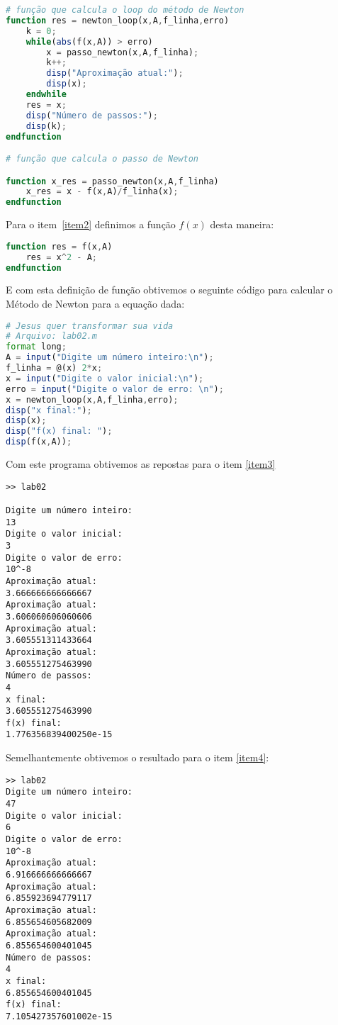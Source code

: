 \documentclass[a4paper]{article}
\begin{document}
\begin{lstlisting}[language = octave]
# função que calcula o loop do método de Newton
function res = newton_loop(x,A,f_linha,erro)
	k = 0;
	while(abs(f(x,A)) > erro)
		x = passo_newton(x,A,f_linha);
		k++;
		disp("Aproximação atual:");
		disp(x);
	endwhile
	res = x;
	disp("Número de passos:");
	disp(k);
endfunction

# função que calcula o passo de Newton

function x_res = passo_newton(x,A,f_linha)
	x_res = x - f(x,A)/f_linha(x);
endfunction
\end{lstlisting}

Para o item~\ref{item2} definimos a função $f(x)$ desta maneira:

\begin{lstlisting}[language = octave]
function res = f(x,A)
	res = x^2 - A;
endfunction
\end{lstlisting}

E com esta definição de função obtivemos o seguinte código para calcular o Método de Newton para a equação dada:
\begin{lstlisting}[language = octave]
# Jesus quer transformar sua vida
# Arquivo: lab02.m
format long;
A = input("Digite um número inteiro:\n");
f_linha = @(x) 2*x;
x = input("Digite o valor inicial:\n");
erro = input("Digite o valor de erro: \n"); 
x = newton_loop(x,A,f_linha,erro);
disp("x final:");
disp(x);
disp("f(x) final: ");
disp(f(x,A));
\end{lstlisting}

Com este programa obtivemos as repostas para o item \ref{item3}
\begin{lstlisting}
>> lab02

Digite um número inteiro:
13
Digite o valor inicial:
3
Digite o valor de erro:
10^-8
Aproximação atual:
3.666666666666667
Aproximação atual:
3.606060606060606
Aproximação atual:
3.605551311433664
Aproximação atual:
3.605551275463990
Número de passos:
4
x final:
3.605551275463990
f(x) final:
1.776356839400250e-15
\end{lstlisting}

Semelhantemente obtivemos o resultado para o item \ref{item4}:
\begin{lstlisting}
>> lab02
Digite um número inteiro:
47
Digite o valor inicial:
6
Digite o valor de erro:
10^-8
Aproximação atual:
6.916666666666667
Aproximação atual:
6.855923694779117
Aproximação atual:
6.855654605682009
Aproximação atual:
6.855654600401045
Número de passos:
4
x final:
6.855654600401045
f(x) final:
7.105427357601002e-15
\end{lstlisting}
\end{document}
